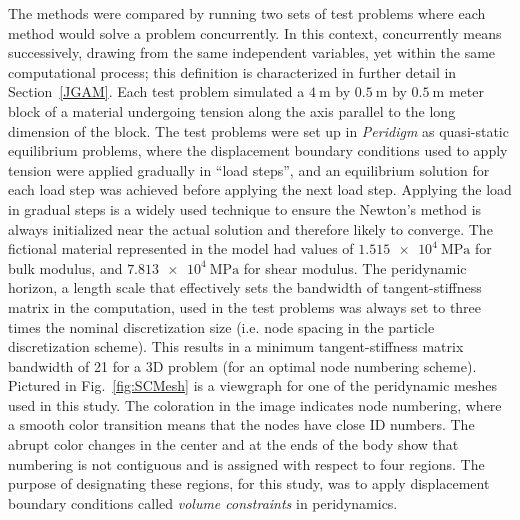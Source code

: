 \documentclass[preprint,12pt]{elsarticle}
\begin{document}
The methods were compared by running two sets of test problems where each
method would solve a problem concurrently. In this context, concurrently means
successively, drawing from the same independent variables, yet within the same
computational process; this definition is characterized in further detail in
Section~\ref{JGAM}. Each test problem simulated a $\SI{4}{\meter}$ by
$\SI{0.5}{\meter}$ by $\SI{0.5}{\meter}$ meter block of a material undergoing
tension along the axis parallel to the long dimension of the block. The test
problems were set up in \emph{Peridigm} as quasi-static equilibrium problems,
where the displacement boundary conditions used to apply tension were applied
gradually in ``load steps'', and an equilibrium solution for each load step was
achieved before applying the next load step. Applying the load
in gradual steps is a widely used technique to ensure the Newton's method is
always initialized near the actual solution and therefore likely to converge.
The fictional material represented in the model had values of
$\SI{1.515e4}{\mega\pascal}$ for bulk modulus, and $\SI{7.813e4}{\mega\pascal}$
for shear modulus. The peridynamic horizon, a length scale that effectively
sets the bandwidth of tangent-stiffness matrix in the computation, used in the test
problems was always set to three times the nominal discretization size (i.e.
node spacing in the particle discretization scheme). This results in a minimum
tangent-stiffness matrix bandwidth of 21 for a 3D problem (for an optimal node
numbering scheme). Pictured in Fig.~\ref{fig:SCMesh} is a viewgraph for one of
the peridynamic meshes used in this study. The coloration in the image
indicates node numbering, where a smooth color transition means that the nodes
have close ID numbers. The abrupt color changes in the center and at the ends
of the body show that numbering is not contiguous and is assigned with respect to four regions. The purpose of designating
these regions, for this study, was to apply displacement boundary
conditions called \emph{volume constraints} in peridynamics. 
\end{document}

